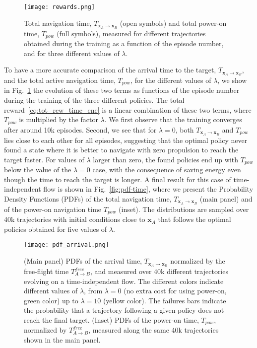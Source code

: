 \documentclass[
]{ceurart}
\newcommand{\ve}[1]{\ensuremath{\boldsymbol{#1}}}
\begin{document}
{\begin{figure}
\centering
\texttt{[image: rewards.png]}
\caption{Total navigation time, $T_{{\ve x}_{A} \rightarrow {\ve x}_{B}}$ (open symbols) and total power-on time, $T_{pow}$ (full symbols), measured for different trajectories obtained during the training as a function of the episode number, and for three different values of $\lambda$.}
\label{fig:rewards}
\end{figure}
To have a more accurate comparison of the arrival time to the target, $T_{{\ve x}_{A} \rightarrow {\ve x}_{B}}$, and the total active navigation time, $T_{pow}$, for the different values of $\lambda$, we show in Fig.~\ref{fig:rewards} the evolution of these two terms as functions of the episode number during the training of the three different policies. The total reward~\eqref{eq:tot_rew_time_ene} is a linear combination of these two terms, where $T_{pow}$ is multiplied by the factor $\lambda$. We first observe that the training converges after around 10k episodes. Second, we see that for $\lambda=0$, both $T_{{\ve x}_{A} \rightarrow {\ve x}_{B}}$ and $T_{pow}$ lies close to each other for all episodes, suggesting that the optimal policy never found a state where it is better to navigate with zero propulsion to reach the target faster. For values of $\lambda$ larger than zero, the found policies end up with $T_{pow}$ below the value of the $\lambda=0$ case,  with the consequence of saving energy even though the time to reach the target is longer. 
A final result for this case of time-independent flow is shown in Fig.~\ref{fig:pdf-time}, where we present the Probability Density Functions (PDFs) of the total navigation time, $T_{{\ve x}_{A} \rightarrow {\ve x}_{B}}$ (main panel) and of the power-on navigation time $T_{pow}$ (inset). The distributions are sampled over 40k trajectories with initial conditions close to ${\ve x}_{A}$ that follows the optimal policies obtained for five values of $\lambda$.
\begin{figure}
\centering
\texttt{[image: pdf\_arrival.png]}
\caption{(Main panel) PDFs of the arrival time, $T_{{\ve x}_{A} \rightarrow {\ve x}_{B}}$ normalized by the free-flight time $T_{A \rightarrow B}^{free}$, and measured over 40k different trajectories evolving on a time-independent flow. The different colors indicate different values of $\lambda$, from $\lambda=0$ (no extra cost for using power-on, green color) up to $\lambda=10$ (yellow color). The failures bars indicate the probability that a trajectory following a given policy does not reach the final target. (Inset) PDFs of the power-on time, $T_{pow}$, normalized by $T_{A \rightarrow B}^{free}$, measured along the same 40k trajectories shown in the main panel.}

\end{figure}}
\end{document}
